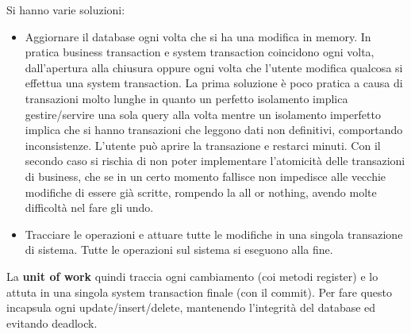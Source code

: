 Si hanno varie soluzioni:
\begin{itemize}
    \item Aggiornare il database ogni volta che si ha una modifica in memory. In pratica business transaction e system transaction coincidono ogni volta, dall'apertura alla chiusura oppure ogni volta che l'utente modifica qualcosa si effettua una system transaction. La prima soluzione è poco pratica a causa di transazioni molto lunghe in quanto un perfetto isolamento implica gestire/servire una sola query alla volta mentre un isolamento imperfetto implica che si hanno transazioni che leggono dati non definitivi, comportando inconsistenze. L'utente può aprire la transazione e restarci minuti. Con il secondo caso si rischia di non poter implementare l'atomicità delle transazioni di business, che se in un certo momento fallisce non impedisce alle vecchie modifiche di essere già scritte, rompendo la all or nothing, avendo molte difficoltà nel fare gli undo.
    \item Tracciare le operazioni e attuare tutte le modifiche in una singola transazione di sistema. Tutte le operazioni sul sistema si eseguono alla fine.
\end{itemize}
La \textbf{unit of work} quindi traccia ogni cambiamento (coi metodi register) e lo attuta in una singola system transaction finale (con il commit). Per fare questo incapsula ogni update/insert/delete, mantenendo l'integrità del database ed evitando deadlock.


